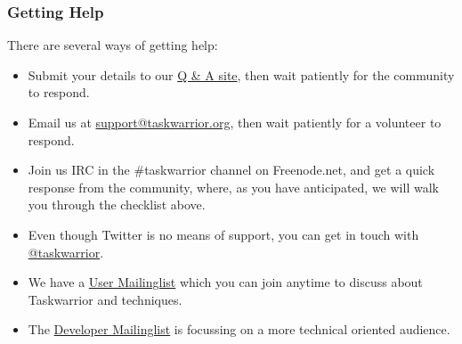 \documentclass[t,handout]{beamer}
\begin{document}
\begin{frame}[fragile]\frametitle{Getting Help}
    \vfill
    There are several ways of getting help:

    \begin{itemize}
        \item Submit your details to our \href{https://answers.tasktools.org}{Q \& A site}, then wait patiently for the community to respond.
        \item Email us at \href{mailto:support@taskwarrior.org}{support@taskwarrior.org}, then wait patiently for a volunteer to respond.
        \item Join us IRC in the \#taskwarrior channel on Freenode.net, and get a quick response from the community, where, as you have anticipated, we will walk you through the checklist above.
        \item Even though Twitter is no means of support, you can get in touch with \href{https://twitter.com/taskwarrior}{@taskwarrior}.
        \item We have a \href{https://groups.google.com/forum/\#!forum/taskwarrior-user}{User Mailinglist} which you can join anytime to discuss about Taskwarrior and techniques.
        \item The \href{https://groups.google.com/forum/\#!forum/taskwarrior-dev}{Developer Mailinglist} is focussing on a more technical oriented audience.
    \end{itemize}

\end{frame}

\end{document}
